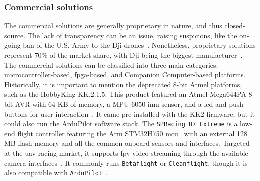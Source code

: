 \subsubsection{Commercial solutions}%
\label{sec:commercial-solutions-hw}
The commercial solutions are generally proprietary in nature, and thus closed-source. The
lack of transparency can be an issue, raising suspicions, like the on-going ban
of the U.S. Army to the Dji
drones~\cite{suasNewsDjiDronesBanned2017,djiBan2022}. Nonetheless, proprietary
solutions represent 70\% of the market share, with Dji being the biggest
manufacturer~\cite{droneAnalyst2021}.
%
The commercial solutions can be classified into three main categories: microcontroller-based, \gls{fpga}-based, and Companion Computer-based
platforms.
Historically, it is important to mention the deprecated 8-bit Atmel platforms,
such as the HobbyKing KK.2.1.5. This product featured an Atmel Mega644PA
8-bit AVR with 64 KB of memory, a MPU-6050 \gls{imu} sensor, and a \gls{lcd} and
push buttons for user interaction~\cite{hobbykingKK2}. It came pre-installed
with the KK2 firmware, but it could also run the ArduPilot software
stack.
%
The \lstinline{SPRacing H7 Extreme} is a low-end flight controller featuring the
Arm STM32H750 \gls{mcu}~\cite{spRacing}
with an external 128 MB flash
memory and all the common onboard sensors and interfaces. Targeted at the \gls{uav} racing market, it supports \gls{fpv} video
streaming through the available camera interfaces~\cite{spRacing}. It commonly
runs \lstinline{Betaflight} or \lstinline{Cleanflight}, though it is also
compatible with
\lstinline{ArduPilot}~\cite{arduPilot-SPRacing}.%
%  
%

